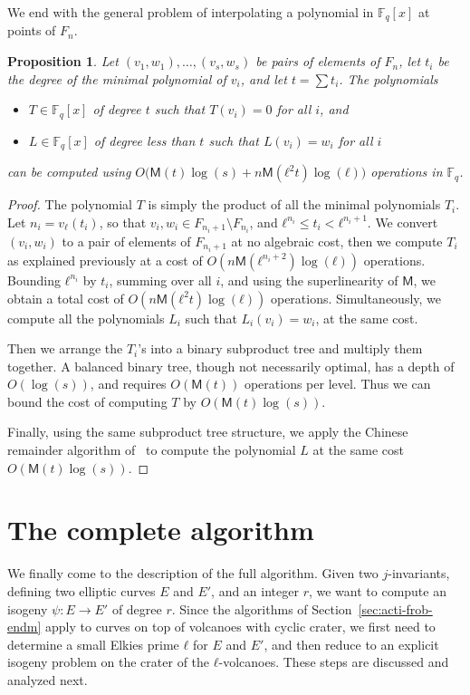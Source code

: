\documentclass{lms}
\newtheorem{prop}[thm]{Proposition}
\def\cout#1{\mathsf{#1}}
\newcommand{\F}{\mathbb{F}}
\newcommand{\MM}{\cout{M}}
\begin{document}
We end with the general problem of interpolating a polynomial in
$\F_q[x]$ at points of $F_n$.

\begin{prop}\label{prop:interpol}
  Let $(v_1,w_1),\dots,(v_s,w_s)$ be pairs of elements of $F_n$, let
  $t_i$ be the degree of the minimal polynomial of $v_i$, and let
  $t=\sum t_i$. The polynomials
  \begin{itemize}
  \item $T∈\F_q[x]$ of degree $t$ such that $T(v_i)=0$ for all $i$,
    and
  \item $L∈\F_q[x]$ of degree less than $t$ such that $L(v_i)=w_i$ for
    all $i$
  \end{itemize}
  can be computed using
  $O\bigl(\MM(t)\log(s) + n\MM(ℓ^2t)\log(ℓ)\bigr)$ operations in $\F_q$.
\end{prop}
\begin{proof}
  The polynomial $T$ is simply the product of all the minimal
  polynomials $T_i$. Let $n_i=v_ℓ(t_i)$, so that
  $v_i,w_i∈F_{n_i+1}\setminus F_{n_i}$, and $ℓ^{n_i}≤t_i<ℓ^{n_i+1}$.
  We convert $(v_i,w_i)$ to a pair of elements of $F_{n_i+1}$ at no
  algebraic cost, then we compute $T_i$ as explained previously at a
  cost of $O(n\MM(ℓ^{n_i+2})\log(ℓ))$ operations. Bounding $ℓ^{n_i}$ by
  $t_i$, summing over all $i$, and using the superlinearity of $\MM$,
  we obtain a total cost of $O(n\MM(ℓ^2t)\log(ℓ))$ operations.
  Simultaneously, we compute all the polynomials $L_i$ such that
  $L_i(v_i)=w_i$, at the same cost.

  Then we arrange the $T_i$'s into a binary subproduct tree and
  multiply them together. A balanced binary
  tree, though not necessarily optimal, has a depth of
  $O(\log (s))$, and requires $O(\MM(t))$ operations per level. Thus
  we can bound the cost of computing $T$ by $O(\MM(t)\log(s))$.

  Finally, using the same subproduct tree structure, we apply the
  Chinese remainder algorithm of~\cite[Chapter~10]{vzGG} to compute
  the polynomial $L$ at the same cost $O(\MM(t)\log(s))$.
\end{proof}


\section{The complete algorithm}
\label{sec:complete-algorithm}

We finally come to the description of the full algorithm. Given two
$j$-invariants, defining two elliptic curves $E$ and $E'$, and an
integer $r$, we want to compute an isogeny $ψ:E→E'$ of degree $r$.
Since the algorithms of Section~\ref{sec:acti-frob-endm} apply to
curves on top of volcanoes with cyclic crater, we first need to
determine a small Elkies prime $ℓ$ for $E$ and $E'$, and then reduce
to an explicit isogeny problem on the crater of the
$ℓ$-volcanoes. These steps are discussed and analyzed next.
\end{document}
